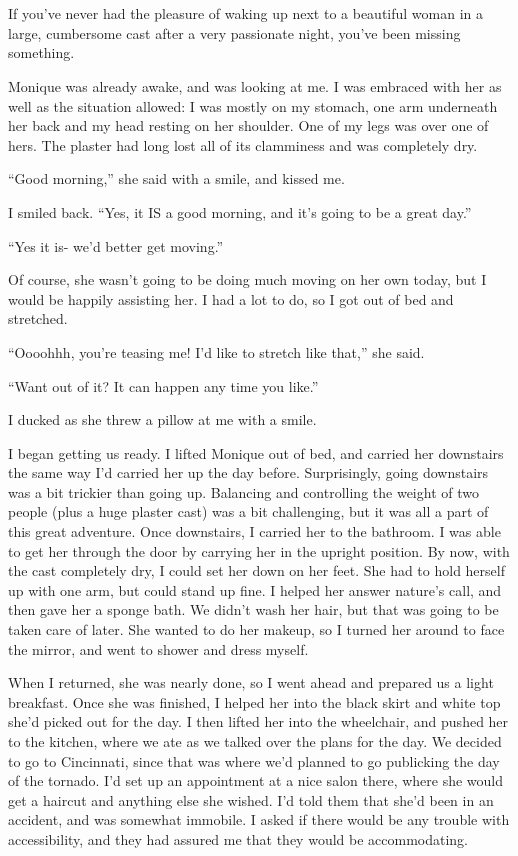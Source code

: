\chapter{}
If you've never had the pleasure of waking up next to a beautiful woman in a large,
cumbersome cast after a very passionate night, you've been missing something.

Monique was already awake, and was looking at me. I was embraced with her as well as the
situation allowed: I was mostly on my stomach, one arm underneath her back and my head resting
on her shoulder. One of my legs was over one of hers. The plaster had long lost all of its
clamminess and was completely dry.

``Good morning,'' she said with a smile, and kissed me.

I smiled back. ``Yes, it IS a good morning, and it's going to be a great day.''

``Yes it is- we'd better get moving.''

Of course, she wasn't going to be doing much moving on her own today, but I would be
happily assisting her. I had a lot to do, so I got out of bed and stretched.

``Oooohhh, you're teasing me! I'd like to stretch like that,'' she said.

``Want out of it? It can happen any time you like.''

I ducked as she threw a pillow at me with a smile.

I began getting us ready. I lifted Monique out of bed, and carried her downstairs the same
way I'd carried her up the day before. Surprisingly, going downstairs was a bit trickier than
going up. Balancing and controlling the weight of two people (plus a huge plaster cast) was a
bit challenging, but it was all a part of this great adventure. Once downstairs, I carried her
to the bathroom. I was able to get her through the door by carrying her in the upright position.
By now, with the cast completely dry, I could set her down on her feet. She had to hold herself
up with one arm, but could stand up fine. I helped her answer nature's call, and then gave her a
sponge bath. We didn't wash her hair, but that was going to be taken care of later. She wanted
to do her makeup, so I turned her around to face the mirror, and went to shower and dress
myself.

When I returned, she was nearly done, so I went ahead and prepared us a light breakfast.
Once she was finished, I helped her into the black skirt and white top she'd picked out for the
day. I then lifted her into the wheelchair, and pushed her to the kitchen, where we ate as we
talked over the plans for the day. We decided to go to Cincinnati, since that was where we'd
planned to go publicking the day of the tornado. I'd set up an appointment at a nice salon
there, where she would get a haircut and anything else she wished. I'd told them that she'd been
in an accident, and was somewhat immobile. I asked if there would be any trouble with
accessibility, and they had assured me that they would be accommodating.

